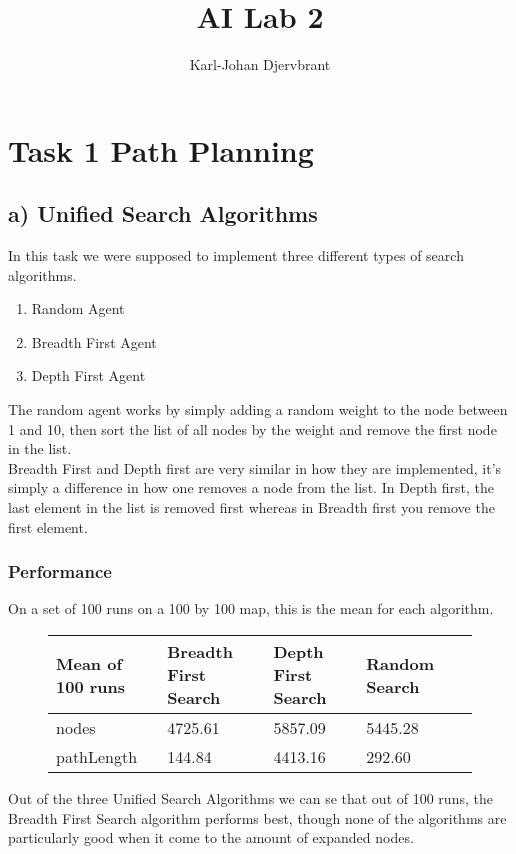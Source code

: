 \documentclass{article}
\title{AI Lab 2}
\author{Karl-Johan Djervbrant}
\begin{document}
\maketitle

\section{Task 1 Path Planning}
\subsection{a) Unified Search Algorithms}
In this task we were supposed to implement three different types of search algorithms.
\begin{enumerate}
    \item Random Agent
    \item Breadth First Agent
    \item Depth First Agent 
\end{enumerate}
The random agent works by simply adding a random weight to the node between 1 and 10, then sort the list of all nodes by the weight and remove the first node in the list.\\
Breadth First and Depth first are very similar in how they are implemented, it's simply a difference in how one removes a node from the list. In Depth first, the last element in
the list is removed first whereas in Breadth first you remove the first element.
\subsubsection{Performance}
On a set of 100 runs on a 100 by 100 map, this is the mean for each algorithm.
\begin{figure}[h]
    \center
    \begin{tabular}{llllr}
        \toprule
        {Mean of 100 runs} & {Breadth First Search} & {Depth First Search} & {Random Search} \\
        \midrule
        nodes      &  4725.61 & 5857.09 & 5445.28\\
        pathLength &   144.84 & 4413.16 & 292.60 \\
        \bottomrule
    \end{tabular}
\end{figure}

Out of the three Unified Search Algorithms we can se that out of 100 runs, the Breadth First Search algorithm performs best, though none of the algorithms are particularly good 
when it come to the amount of expanded nodes.
\end{document}
